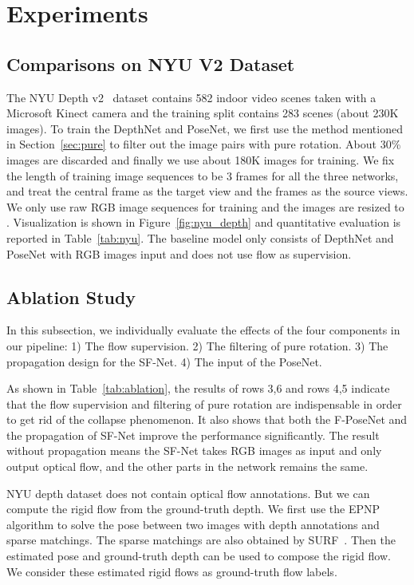 \documentclass[10pt,twocolumn,letterpaper]{article}
\begin{document}
\section{Experiments}

\subsection{Comparisons on NYU V2 Dataset}

The NYU Depth v2~\cite{silberman2012indoor} dataset contains 582 indoor video scenes taken with a Microsoft Kinect camera and the training split contains 283 scenes (about 230K images). To train the DepthNet and PoseNet, we first use the method mentioned in Section~\ref{sec:pure} to filter out the image pairs with pure rotation. About 30\% images are discarded and finally we use about 180K images for training. We fix the length of training image sequences to be 3 frames for all the three networks, and treat the central frame as the target view and the  frames as the source views. We only use raw RGB image sequences for training and the images are resized to . Visualization is shown in Figure~\ref{fig:nyu_depth} and quantitative evaluation is reported in Table~\ref{tab:nyu}. The baseline model only consists of DepthNet and PoseNet with RGB images input and does not use flow as supervision.  






\subsection{Ablation Study}

\label{abla}

In this subsection, we individually evaluate the effects of the four components in our pipeline: 1) The flow supervision. 2) The filtering of pure rotation.  3) The propagation design for the SF-Net. 4) The input of the PoseNet. 

As shown in Table~\ref{tab:ablation}, the results of rows 3,6 and rows 4,5 indicate that the flow supervision and filtering of pure rotation are indispensable in order to get rid of the collapse phenomenon. It also shows that both the F-PoseNet and the propagation of SF-Net improve the performance significantly. The result without propagation means the SF-Net takes RGB images as input and only output optical flow, and the other parts in the network remains the same.

NYU depth dataset does not contain optical flow annotations. But we can compute the rigid flow from the ground-truth depth. We first use the EPNP~\cite{lepetit2009epnp} algorithm to solve the pose between two images with depth annotations and sparse matchings. The sparse matchings are also obtained by SURF~\cite{bay2006surf}. Then the estimated pose and ground-truth depth can be used to compose the rigid flow. We consider these estimated rigid flows as ground-truth flow labels.  
\end{document}
